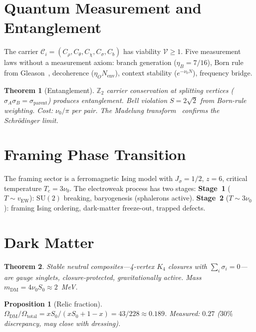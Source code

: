 \documentclass[11pt,twocolumn]{article}
\newtheorem{theorem}{Theorem}
\newtheorem{proposition}{Proposition}
\begin{document}
\section{Quantum Measurement and Entanglement}
\label{sec:quantum}

The carrier $\mathcal{C}_i=(C_\rho,C_\theta,C_\chi,C_\sigma,C_b)$ has viability $\mathcal{V}\geq 1$.
Five measurement laws without a measurement axiom:
branch generation ($\eta_B=7/16$),
Born rule from Gleason~\cite{gleason1957},
decoherence ($\eta_O N_{\mathrm{env}}$),
context stability ($e^{-\nu_0 N}$),
frequency bridge.

\begin{theorem}[Entanglement]
$\mathbb{Z}_2$ carrier conservation at splitting vertices ($\sigma_A\sigma_B=\sigma_{\mathrm{parent}}$) produces entanglement.
Bell violation $S=2\sqrt{2}$ from Born-rule weighting.
Cost: $\nu_0/\pi$ per pair.
The Madelung transform~\cite{madelung1927} confirms the Schr\"odinger limit.
\end{theorem}


\section{Framing Phase Transition}
\label{sec:transition}

The framing sector is a ferromagnetic Ising model with $J_\sigma=1/2$, $z=6$, critical temperature $T_c=3\nu_0$.
The electroweak process has two stages:
\textbf{Stage~1} ($T\sim v_{\mathrm{EW}}$): $\mathrm{SU}(2)$ breaking, baryogenesis (sphalerons active).
\textbf{Stage~2} ($T\sim 3\nu_0$): framing Ising ordering, dark-matter freeze-out, trapped defects.

\section{Dark Matter}
\label{sec:dm}

\begin{theorem}
Stable neutral composites---4-vertex $K_4$ closures with $\sum_i\sigma_i=0$---are gauge singlets, closure-protected, gravitationally active.
Mass $m_{\mathrm{DM}}=4\nu_0 S_0\approx 2$~MeV.
\end{theorem}

\begin{proposition}[Relic fraction]
$\Omega_{\mathrm{DM}}/\Omega_{\mathrm{total}}=xS_0/(xS_0+1{-}x)=43/228\approx 0.189$.
Measured: $0.27$ ($30\%$ discrepancy, may close with dressing).
\end{proposition}
\end{document}
